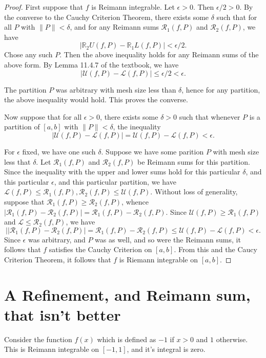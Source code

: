 \documentclass[12pt]{article}
\newcommand{\R}{\mathbb{R}}
\newcommand\norm[1]{\lVert#1\rVert} %
\theoremstyle{definition}
\begin{document}
    \begin{proof}
        First suppose that $f$ is Reimann integrable. Let $\epsilon > 0$. Then $\epsilon /2 > 0$. By the converse to the Cauchy Criterion Theorem, there exists some $\delta$ such that for all $P$ with $\norm{P} < \delta$, and for any Reimann sums $\mathcal{R}_1(f,P)$ and $\mathcal{R}_2(f,P)$, we have 
      \[
        \left| \R_2{U}(f,P) - \R_1{L}(f,P) \right| < \epsilon/2.
        \]   
        Chose any such $P$. Then the above inequality holds for any Reimann sums of the above form. By Lemma 11.4.7 of the textbook, we have
        \[
            \left| \mathcal{U}(f,P) - \mathcal{L}(f,P) \right| \le \epsilon/2 < \epsilon.
            \]

            The partition $P$ was arbitrary with mesh size less than $\delta$, hence for any partition, the above inequality would hold. This proves the converse.

        Now suppose that for all $\epsilon > 0$, there exists some $\delta > 0$ such that whenever $ P $ is a partition of $[a,b]$ with $\norm{P} < \delta$, the inequality
        \[
        \left| \mathcal{U}(f,P) - \mathcal{L}(f,P) \right| = \mathcal{U}(f,P) - \mathcal{L}(f,P) < \epsilon.
        \] 

        For $\epsilon$ fixed, we have one such $\delta.$ Suppose we have some parition $P$ with mesh size less that $\delta$. Let $\mathcal{R}_1(f,P)$ and $ \mathcal{R}_2(f,P)$ be Reimann sums for this partition. Since the inequality with the upper and lower sums hold for this particular $\delta$, and this particular $\epsilon$, and this particular partition, we have $\mathcal{L}(f,P)\le \mathcal{R}_1(f,P), \mathcal{R}_2(f,P)\le \mathcal{U}(f,P) $. Without loss of generality, suppose that $\mathcal{R}_1(f,P) \ge \mathcal{R}_2(f,P)$, whence $|\mathcal{R}_1(f,P) - \mathcal{R}_2(f,P)| = \mathcal{R}_1(f,P) - \mathcal{R}_2(f,P)$. Since $\mathcal{U}(f,P) \ge \mathcal{R}_1(f,P)$ and $ \mathcal{L} \le \mathcal{R}_2(f,P) $, we have 
        \[
        |\left|\mathcal{R}_1(f,P) - \mathcal{R}_2(f,P)\right| = \mathcal{R}_1(f,P) - \mathcal{R}_2(f,P) \le \mathcal{U}(f,P) - \mathcal{L}(f,P) < \epsilon.
        \]
        Since $\epsilon$ was arbitrary, and $P$ was as well, and so were the Reimann sums, it follows that $f$ satisfies the Cauchy Criterion on $[a,b]$. From this and the Caucy Criterion Theorem, it follows that $f$ is Riemann integrable on $[a,b]$.
    \end{proof}

    \section{A Refinement, and Reimann sum, that isn't better}

    Consider the function $f(x)$ which is defined as $-1$ if $x>0$ and $1$ otherwise. This is Reimann integrable on $[-1,1]$, and it's integral is zero. 
\end{document}
